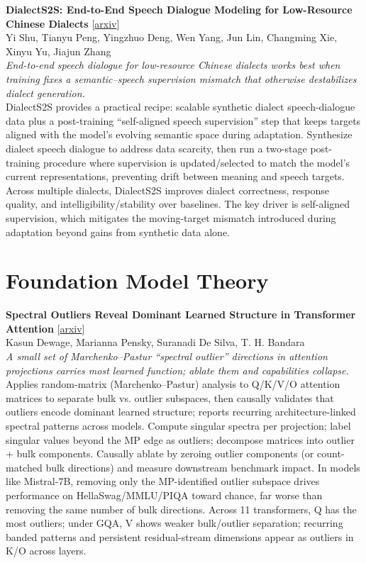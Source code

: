 \documentclass[12pt,letterpaper]{article}
\begin{document}
\medskip

{\small\textbf{DialectS2S: End-to-End Speech Dialogue Modeling for Low-Resource Chinese Dialects}} {\scriptsize[\href{https://arxiv.org/abs/2608.08067}{arxiv}]}\\
{\scriptsize Yi Shu, Tianyu Peng, Yingzhuo Deng, Wen Yang, Jun Lin, Changming Xie, Xinyu Yu, Jiajun Zhang}\\

{\small\textit{End-to-end speech dialogue for low-resource Chinese dialects works best when training fixes a semantic--speech supervision mismatch that otherwise destabilizes dialect generation.}}\\[1pt]
{\footnotesize DialectS2S provides a practical recipe: scalable synthetic dialect speech-dialogue data plus a post-training ``self-aligned speech supervision'' step that keeps targets aligned with the model's evolving semantic space during adaptation. Synthesize dialect speech dialogue to address data scarcity, then run a two-stage post-training procedure where supervision is updated/selected to match the model's current representations, preventing drift between meaning and speech targets. Across multiple dialects, DialectS2S improves dialect correctness, response quality, and intelligibility/stability over baselines. The key driver is self-aligned supervision, which mitigates the moving-target mismatch introduced during adaptation beyond gains from synthetic data alone.}

\medskip


\section*{Foundation Model Theory}

{\small\textbf{Spectral Outliers Reveal Dominant Learned Structure in Transformer Attention}} {\scriptsize[\href{https://arxiv.org/abs/2608.07921}{arxiv}]}\\
{\scriptsize Kasun Dewage, Marianna Pensky, Suranadi De Silva, T. H. Bandara}\\

{\small\textit{A small set of Marchenko--Pastur ``spectral outlier'' directions in attention projections carries most learned function; ablate them and capabilities collapse.}}\\[1pt]
{\footnotesize Applies random-matrix (Marchenko--Pastur) analysis to Q/K/V/O attention matrices to separate bulk vs. outlier subspaces, then causally validates that outliers encode dominant learned structure; reports recurring architecture-linked spectral patterns across models. Compute singular spectra per projection; label singular values beyond the MP edge as outliers; decompose matrices into outlier + bulk components. Causally ablate by zeroing outlier components (or count-matched bulk directions) and measure downstream benchmark impact. In models like Mistral-7B, removing only the MP-identified outlier subspace drives performance on HellaSwag/MMLU/PIQA toward chance, far worse than removing the same number of bulk directions. Across 11 transformers, Q has the most outliers; under GQA, V shows weaker bulk/outlier separation; recurring banded patterns and persistent residual-stream dimensions appear as outliers in K/O across layers.}
\end{document}
